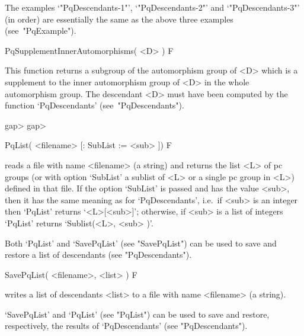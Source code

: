 The     examples     `"PqDescendants-1"',     `"PqDescendants-2"'     and
`"PqDescendants-3"' (in order) are essentially  the  same  as  the  above
three examples (see~"PqExample").

\>PqSupplementInnerAutomorphisms( <D> ) F

This function returns  a subgroup of the automorphism  group of <D> which
is  a supplement  to the  inner automorphism  group of  <D> in  the whole
automorphism group.   The descendant <D>  must have been computed  by the
function `PqDescendants' (see~"PqDescendants").

\beginexample
gap>
gap>
\endexample

\>PqList( <filename> [: SubList := <sub> ]) F

reads a file with name <filename> (a string) and returns the list <L>  of
pc groups (or with option `SubList' a sublist of <L> or a single pc group
in <L>) defined in that file. If the option `SubList' is passed  and  has
the value <sub>, then it has the same  meaning  as  for  `PqDescendants',
i.e.~if  <sub>  is  an  integer  then  `PqList'   returns   `<L>[<sub>]';
otherwise, if <sub> is a list of integers `PqList' returns  `Sublist(<L>,
<sub> )'.

Both `PqList' and `SavePqList' (see "SavePqList") can be used to save and
restore a list of descendants (see "PqDescendants").

\>SavePqList( <filename>, <list> ) F

writes a list of descendants <list> to a file  with  name  <filename>  (a
string).

`SavePqList' and `PqList' (see "PqList") can be used to save and restore,
respectively, the results of `PqDescendants' (see "PqDescendants").

